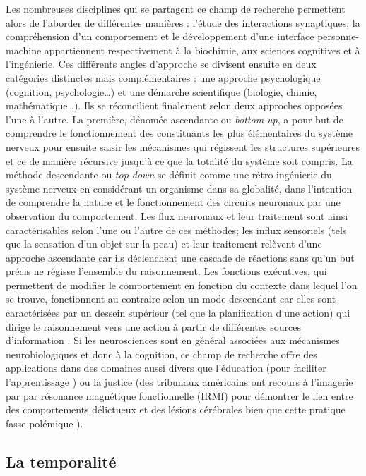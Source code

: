 \documentclass[12pt,fleqn,oneside,french,openany]{book} %
\begin{document}
Les nombreuses disciplines qui se partagent ce champ de recherche permettent alors de l'aborder de différentes manières : l'étude des interactions synaptiques, la compréhension d'un comportement et le développement d'une interface personne-machine appartiennent respectivement à la biochimie, aux sciences cognitives et à l'ingénierie. Ces différents angles d'approche se divisent ensuite en deux catégories distinctes mais complémentaires : une approche psychologique (cognition, psychologie…) et une démarche scientifique (biologie, chimie, mathématique…). Ils se réconcilient finalement selon deux approches opposées l'une à l'autre. La première, dénomée ascendante ou \emph{bottom-up}, a pour but de comprendre le fonctionnement des constituants les plus élémentaires du système nerveux pour ensuite saisir les mécanismes qui régissent les structures supérieures et ce de manière récursive jusqu'à ce que la totalité du système soit compris. La méthode descendante ou \emph{top-down} se définit comme une rétro ingénierie du système nerveux en considérant un organisme dans sa globalité, dans l'intention de comprendre la nature et le fonctionnement des circuits neuronaux par une observation du comportement. Les flux neuronaux et leur traitement sont ainsi caractérisables selon l'une ou l'autre de ces méthodes; les influx sensoriels (tels que la sensation d'un objet sur la peau) et leur traitement relèvent d'une approche ascendante car ils déclenchent une cascade de réactions sans qu'un but précis ne régisse l'ensemble du raisonnement. Les fonctions exécutives, qui permettent de modifier le comportement en fonction du contexte dans lequel l'on se trouve, fonctionnent au contraire selon un mode descendant car elles sont caractérisées par un dessein supérieur (tel que la planification d'une action) qui dirige le raisonnement vers une action à partir de différentes sources d'information \cite{bottomupTopdown,foncExec}. 
Si les neurosciences sont en général associées aux mécanismes neurobiologiques et donc à la cognition, ce champ de recherche offre des applications dans des domaines aussi divers que l'éducation (pour faciliter l'apprentissage \cite{pedagogie}) ou la justice (des tribunaux américains ont recours à l'imagerie par par résonance magnétique fonctionnelle (IRMf) pour démontrer le lien entre des comportements délictueux et des lésions cérébrales bien que cette pratique fasse polémique \cite{justice}).

\subsection[La temporalité]{La temporalité \cite{reptemps,basePerception,perceptionTemps,tempsEtIllusions}} \label{ssec:temporalite} %
\end{document}
